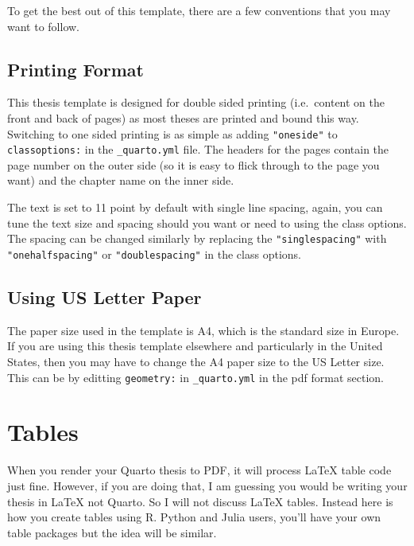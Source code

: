 \documentclass[
  letterpaper,
  12pt,
  oneside,
  spanish,
  doublespacing,
  headsepline,
  parskip]{MastersDoctoralThesis}
\begin{document}
To get the best out of this template, there are a few conventions that
you may want to follow.

\hypertarget{printing-format}{%
\subsection{Printing Format}\label{printing-format}}

This thesis template is designed for double sided printing (i.e.~content
on the front and back of pages) as most theses are printed and bound
this way. Switching to one sided printing is as simple as adding
\texttt{"oneside"} to \texttt{classoptions:} in the
\texttt{\_quarto.yml} file. The headers for the pages contain the page
number on the outer side (so it is easy to flick through to the page you
want) and the chapter name on the inner side.

The text is set to 11 point by default with single line spacing, again,
you can tune the text size and spacing should you want or need to using
the class options. The spacing can be changed similarly by replacing the
\texttt{"singlespacing"} with \texttt{"onehalfspacing"} or
\texttt{"doublespacing"} in the class options.

\hypertarget{using-us-letter-paper}{%
\subsection{Using US Letter Paper}\label{using-us-letter-paper}}

The paper size used in the template is A4, which is the standard size in
Europe. If you are using this thesis template elsewhere and particularly
in the United States, then you may have to change the A4 paper size to
the US Letter size. This can be by editting \texttt{geometry:} in
\texttt{\_quarto.yml} in the pdf format section.

\hypertarget{tables}{%
\section{Tables}\label{tables}}

When you render your Quarto thesis to PDF, it will process \LaTeX{}
table code just fine. However, if you are doing that, I am guessing you
would be writing your thesis in \LaTeX{} not Quarto. So I will not
discuss \LaTeX{} tables. Instead here is how you create tables using R.
Python and Julia users, you'll have your own table packages but the idea
will be similar.
\end{document}

